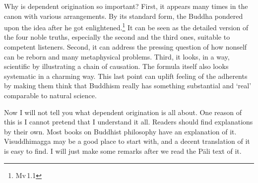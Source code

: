 Why is dependent origination so important? First, it appears many times in the canon with various arrangements. By its standard form, the Buddha pondered upon the idea after he got enlightened.\footnote{Mv\,1.1} It can be seen as the detailed version of the four noble truths, especially the second and the third ones, suitable to competent listeners. Second, it can address the pressing question of how nonself can be reborn and many metaphysical problems. Third, it looks, in a way, scientific by illustrating a chain of causation. The formula itself also looks systematic in a charming way. This last point can uplift feeling of the adherents by making them think that Buddhism really has something substantial and `real' comparable to natural science.

Now I will not tell you what dependent origination is all about. One reason of this is I cannot pretend that I understand it all. Readers should find explanations by their own. Most books on Buddhist philosophy have an explanation of it. Visuddhimagga may be a good place to start with, and a decent translation of it is easy to find. I will just make some remarks after we read the P\=ali text of it.

